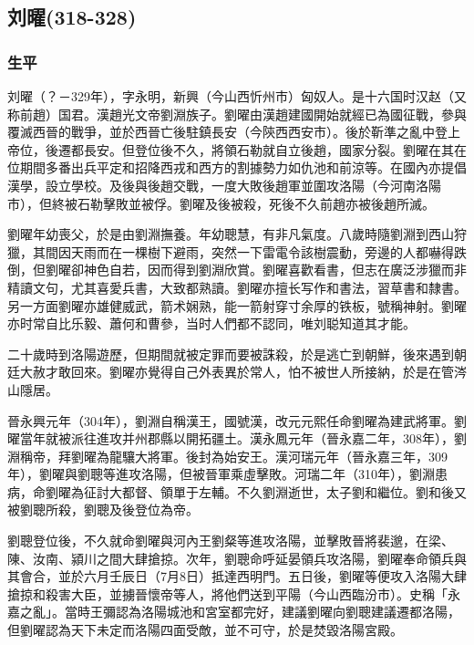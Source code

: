 
\subsection{刘曜\tiny(318-328)}

\subsubsection{生平}

刘曜（？－329年），字永明，新興（今山西忻州市）匈奴人。是十六国时汉赵（又称前趙）国君。漢趙光文帝劉淵族子。劉曜由漢趙建國開始就經已為國征戰，參與覆滅西晉的戰爭，並於西晉亡後駐鎮長安（今陝西西安市）。後於靳準之亂中登上帝位，後遷都長安。但登位後不久，將領石勒就自立後趙，國家分裂。劉曜在其在位期間多番出兵平定和招降西戎和西方的割據勢力如仇池和前涼等。在國內亦提倡漢學，設立學校。及後與後趙交戰，一度大敗後趙軍並圍攻洛陽（今河南洛陽市），但終被石勒擊敗並被俘。劉曜及後被殺，死後不久前趙亦被後趙所滅。

劉曜年幼喪父，於是由劉淵撫養。年幼聰慧，有非凡氣度。八歲時隨劉淵到西山狩獵，其間因天雨而在一棵樹下避雨，突然一下雷電令該樹震動，旁邊的人都嚇得跌倒，但劉曜卻神色自若，因而得到劉淵欣賞。劉曜喜歡看書，但志在廣泛涉獵而非精讀文句，尤其喜愛兵書，大致都熟讀。劉曜亦擅长写作和書法，習草書和隸書。另一方面劉曜亦雄健威武，箭术娴熟，能一箭射穿寸余厚的铁板，號稱神射。劉曜亦时常自比乐毅、蕭何和曹參，当时人們都不認同，唯刘聪知道其才能。

二十歲時到洛陽遊歷，但期間就被定罪而要被誅殺，於是逃亡到朝鮮，後來遇到朝廷大赦才敢回來。劉曜亦覺得自己外表異於常人，怕不被世人所接納，於是在管涔山隱居。

晉永興元年（304年），劉淵自稱漢王，國號漢，改元元熙任命劉曜為建武將軍。劉曜當年就被派往進攻并州郡縣以開拓疆土。漢永鳳元年（晉永嘉二年，308年），劉淵稱帝，拜劉曜為龍驤大將軍。後封為始安王。漢河瑞元年（晉永嘉三年，309年），劉曜與劉聰等進攻洛陽，但被晉軍乘虛擊敗。河瑞二年（310年），劉淵患病，命劉曜為征討大都督、領單于左輔。不久劉淵逝世，太子劉和繼位。劉和後又被劉聰所殺，劉聰及後登位為帝。

劉聰登位後，不久就命劉曜與河內王劉粲等進攻洛陽，並擊敗晉將裴邈，在梁、陳、汝南、潁川之間大肆搶掠。次年，劉聰命呼延晏領兵攻洛陽，劉曜奉命領兵與其會合，並於六月壬辰日（7月8日）抵達西明門。五日後，劉曜等便攻入洛陽大肆搶掠和殺害大臣，並擄晉懷帝等人，將他們送到平陽（今山西臨汾市）。史稱「永嘉之亂」。當時王彌認為洛陽城池和宮室都完好，建議劉曜向劉聰建議遷都洛陽，但劉曜認為天下未定而洛陽四面受敵，並不可守，於是焚毀洛陽宮殿。

